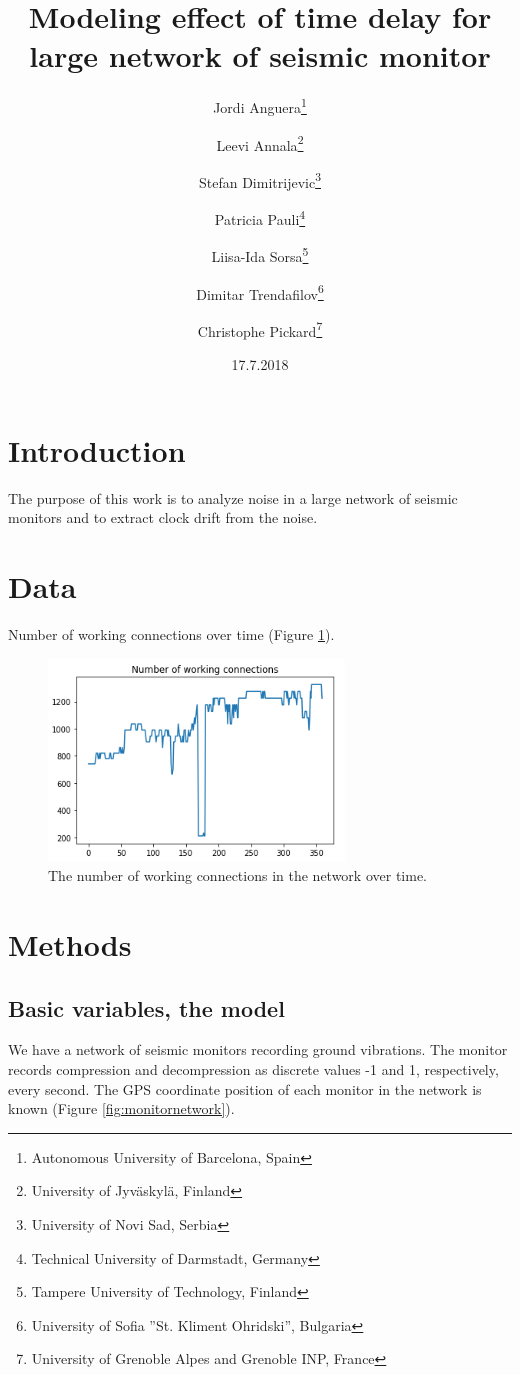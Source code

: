 \documentclass[12pt,a4paper,english]{article}
\author{Jordi Anguera\thanks{Autonomous University of Barcelona, Spain} \and Leevi Annala\thanks{University of Jyväskylä, Finland} \and Stefan Dimitrijevic\thanks{University of Novi Sad, Serbia} \and Patricia Pauli\thanks{Technical University of Darmstadt, Germany} \and Liisa-Ida Sorsa\thanks{Tampere University of Technology, Finland} \and Dimitar Trendafilov\thanks{University of Sofia ''St. Kliment Ohridski'', Bulgaria} \and Christophe Pickard\thanks{University of Grenoble Alpes and Grenoble INP, France}}
\title{Modeling effect of time delay for large network of seismic monitor}
\date{17.7.2018}
\begin{document}
\maketitle

\begin{abstract}

\end{abstract}

\section{Introduction}

The purpose of this work is to analyze noise in a large network of seismic monitors and to extract clock drift from the noise. 

\section{Data}

Number of working connections over time (Figure \ref{fig:workingconnections}). 

\begin{figure}[ht]
  \begin{center}   
   \includegraphics[width=0.7\textwidth]{working_connections.png}
  \end{center}
  \caption{The number of working connections in the network over time. }\label{fig:workingconnections}
\end{figure}

\section{Methods}

\subsection{Basic variables, the model}
We have a network of seismic monitors recording ground vibrations. The monitor records compression and decompression as discrete values -1 and 1, respectively, every second. The GPS coordinate position of each monitor in the network is known (Figure \ref{fig:monitornetwork}). 
\end{document}
